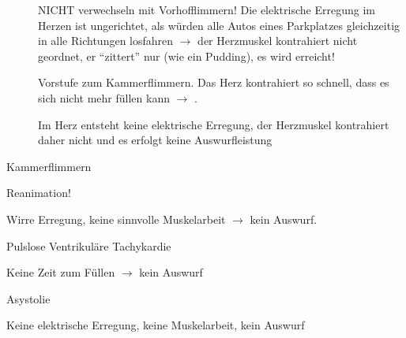 {
{
\begin{description}
  \item[]
  \label{topic:kammerflimmern}
  NICHT verwechseln mit Vorhofflimmern! Die elektrische
  Erregung im Herzen ist ungerichtet, als würden alle Autos
  eines Parkplatzes gleichzeitig in alle Richtungen losfahren
  ${\rightarrow}$ der Herzmuskel kontrahiert nicht geordnet,
  er \enquote{zittert} nur (wie ein Pudding), es wird  erreicht!
  \item[]
  \label{topic:pulslose-ventrikulaere-tachykardie}
  Vorstufe zum Kammerflimmern. Das Herz kontrahiert
  so schnell, dass es sich nicht mehr füllen kann
  ${\rightarrow}$ .
  \item[] 
  \label{topic:asystolie}
  
  Im Herz entsteht keine elektrische
  Erregung, der Herzmuskel kontrahiert daher nicht und es erfolgt
  {keine Auswurfleistung}
\end{description}


}
{
\begin{compactitem}
  \item Kammerflimmern
  \begin{compactitem}  \item {Reanimation!}
    \item Wirre Erregung, keine sinnvolle Muskelarbeit ${\rightarrow}$ kein
    Auswurf.
  \end{compactitem}
  \item Pulslose Ventrikuläre Tachykardie
  \begin{compactitem}
    \item Keine Zeit zum Füllen ${\rightarrow}$ kein Auswurf
  \end{compactitem}
  \item Asystolie
  \begin{compactitem}
    \item Keine elektrische Erregung, keine Muskelarbeit, kein
    Auswurf
  \end{compactitem}
\end{compactitem}

}{}{}{}



    
}
